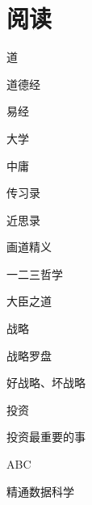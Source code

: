 \chapter{阅读}

道
\begin{enumbox}
\item 道德经
\item 易经
\item 大学
\item 中庸
\item 传习录
\item 近思录
\item 画道精义
\item 一二三哲学
\item 大臣之道
\end{enumbox}

战略
\begin{enumbox}
\item 战略罗盘
\item 好战略、坏战略
\end{enumbox}

投资
\begin{enumbox}
\item 投资最重要的事
\end{enumbox}

ABC
\begin{enumbox}
\item 精通数据科学
\end{enumbox}

